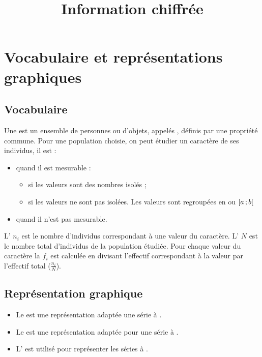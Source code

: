 \documentclass[12pt,a4paper]{article}
\date{}
\title{Information chiffrée }
\begin{document}




\section{Vocabulaire et représentations graphiques}

\subsection{Vocabulaire}

\begin{mydefs}
	Une  est un ensemble de personnes ou d'objets, appelés , définis par une propriété commune. 
	Pour une population choisie, on peut étudier un caractère de ses individus, il est :
	
	\begin{itemize}
		\item {} quand il est mesurable :
		\begin{itemize}
			\item {} si les valeurs sont des nombres isolés ;
			\item {} si les valeurs ne sont pas isolées. Les valeurs sont regroupées en  ou   $\mbox{\ensuremath{\left[a\mathpunct{};b\right[}}$ %
		\end{itemize}
		\item {} quand il n'est pas mesurable. %
	\end{itemize}

	L' $n_i$ est le nombre d'individus correspondant à une valeur du caractère. L' $N$ est le nombre total d'individus de la population étudiée.
	Pour chaque valeur du caractère la  $f_i$ est calculée en divisant l'effectif correspondant à la valeur par l'effectif total  ($\frac{n_i}{N}$).
\end{mydefs}

\subsection{Représentation graphique}

\begin{mybilan}
	\begin{itemize}
		\item Le  est une représentation adaptée une série à .
		\item Le  est une représentation adaptée pour une série à .
		\item L' est utilisé pour représenter les séries à .
	\end{itemize}
\end{mybilan}
\end{document}
